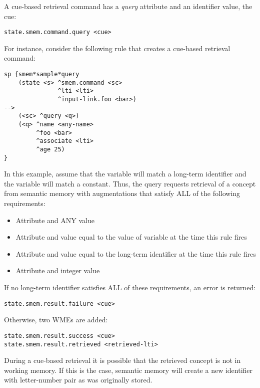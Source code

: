 A cue-based retrieval command has a \emph{query} attribute and an identifier value, the cue:

\begin{verbatim}
state.smem.command.query <cue>
\end{verbatim}

For instance, consider the following rule that creates a cue-based retrieval command:

\begin{verbatim}
sp {smem*sample*query
    (state <s> ^smem.command <sc>
               ^lti <lti>
               ^input-link.foo <bar>)
-->
    (<sc> ^query <q>)
    (<q> ^name <any-name>
         ^foo <bar>
         ^associate <lti>
         ^age 25)
}
\end{verbatim}

In this example, assume that the  variable will match a long-term identifier and the  variable will match a constant.  Thus, the query requests retrieval of a concept from semantic memory with augmentations that satisfy ALL of the following requirements:

\begin{itemize}
\item Attribute  and ANY value
\item Attribute  and value equal to the value of variable  at the time this rule fires
\item Attribute  and value equal to the long-term identifier  at the time this rule fires
\item Attribute  and integer value 
\end{itemize}

If no long-term identifier satisfies ALL of these requirements, an error is returned:

\begin{verbatim}
state.smem.result.failure <cue>
\end{verbatim}

Otherwise, two WMEs are added:

\begin{verbatim}
state.smem.result.success <cue>
state.smem.result.retrieved <retrieved-lti>
\end{verbatim}

During a cue-based retrieval it is possible that the retrieved concept is not in working memory.  If this is the case, semantic memory will create a new identifier with letter-number pair as was originally stored.

